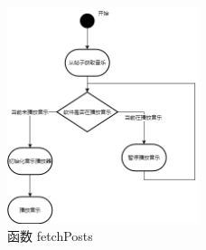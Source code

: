 \documentclass{base}
\numberwithin{figure}{section} %
\begin{document}
\begin{figure}[H]
    \centering
    \includegraphics[width=0.5\textwidth]{images/class-activity-1.png}
    \caption{函数 fetchPosts}
\end{figure}
\end{document}
